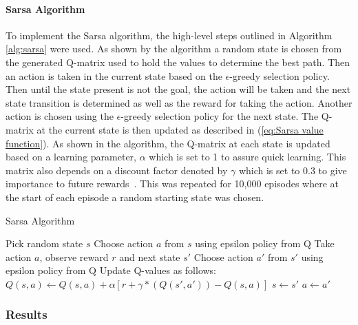 \documentclass[12pt,american]{report}
\begin{document}
\paragraph{Sarsa Algorithm}
To implement the Sarsa algorithm, the high-level steps outlined in Algorithm \ref{alg:sarsa} were used.  As shown by the algorithm a random state is chosen from the generated Q-matrix used to hold the values to determine the best path.  Then an action is taken in the current state based on the \begin{math}\epsilon\end{math}-greedy selection policy.  Then until the state present is not the goal, the action will be taken and the next state transition is determined as well as the reward for taking the action. Another action is chosen using the \begin{math}\epsilon\end{math}-greedy selection policy for the next state. The Q-matrix at the current state is then updated as described in (\ref{eq:Sarsa value function}). As shown in the algorithm, the Q-matrix at each state is updated based on a learning parameter, \begin{math}\alpha\end{math} which is set to 1 to assure quick learning. This matrix also depends on a discount factor denoted by \begin{math}\gamma\end{math} which is set to 0.3 to give importance to future rewards~\cite{Eden}. This was repeated for 10,000 episodes where at the start of each episode a random starting state was chosen.



\begin{algorithm}
\caption{Sarsa Algorithm~\cite{Eden}}
\label{alg:sarsa}
\begin{algorithmic} 
\State Pick random state $s$
\State Choose action $a$ from $s$ using epsilon policy from Q
\State Take action $a$, observe reward $r$ and next state $s'$
\State Choose action $a'$ from $s'$ using epsilon policy from Q
\State Update Q-values as follows:
\State $Q(s,a) \leftarrow Q(s,a) + \alpha [r+ \gamma*(Q(s',a')) - Q(s,a)] $
\State $s \leftarrow s'$
\State $a \leftarrow a'$
\EndWhile
\EndFor
\end{algorithmic}
\end{algorithm}


\subsubsection{Results}
\end{document}
